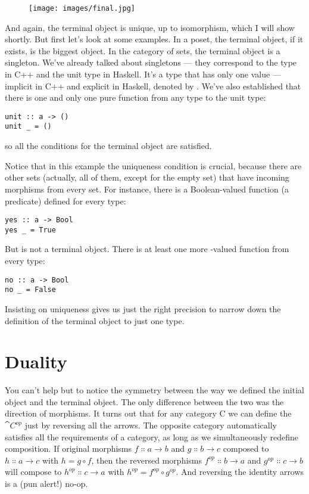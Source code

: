 \begin{figure}[H]
\centering
\texttt{[image: images/final.jpg]}
\end{figure}

\noindent
And again, the terminal object is unique, up to isomorphism, which I
will show shortly. But first let's look at some examples. In a poset,
the terminal object, if it exists, is the biggest object. In the
category of sets, the terminal object is a singleton. We've already
talked about singletons --- they correspond to the  type in
C++ and the unit type \code{()} in Haskell. It's a type that has only
one value --- implicit in C++ and explicit in Haskell, denoted by
\code{()}. We've also established that there is one and only one pure
function from any type to the unit type:

\begin{Verbatim}
unit :: a -> ()
unit _ = ()
\end{Verbatim}
so all the conditions for the terminal object are satisfied.

Notice that in this example the uniqueness condition is crucial, because
there are other sets (actually, all of them, except for the empty set)
that have incoming morphisms from every set. For instance, there is a
Boolean-valued function (a predicate) defined for every type:

\begin{Verbatim}
yes :: a -> Bool
yes _ = True
\end{Verbatim}
But  is not a terminal object. There is at least one more
-valued function from every type:

\begin{Verbatim}
no :: a -> Bool
no _ = False
\end{Verbatim}
Insisting on uniqueness gives us just the right precision to narrow down
the definition of the terminal object to just one type.

\section{Duality}

You can't help but to notice the symmetry between the way we defined the
initial object and the terminal object. The only difference between the
two was the direction of morphisms. It turns out that for any category C
we can define the  $\cat{C}^{op}$ just by
reversing all the arrows. The opposite category automatically satisfies
all the requirements of a category, as long as we simultaneously
redefine composition. If original morphisms
$f \Colon a \to b$ and $g \Colon b \to c$ composed
to $h \Colon a \to c$ with $h = g \circ f$, then the reversed
morphisms $f^{op} \Colon b \to a$ and $g^{op} \Colon c \to b$ will compose to
$h^{op} \Colon c \to a$ with $h^{op} = f^{op} \circ g^{op}$. And reversing
the identity arrows is a (pun alert!) no-op.

